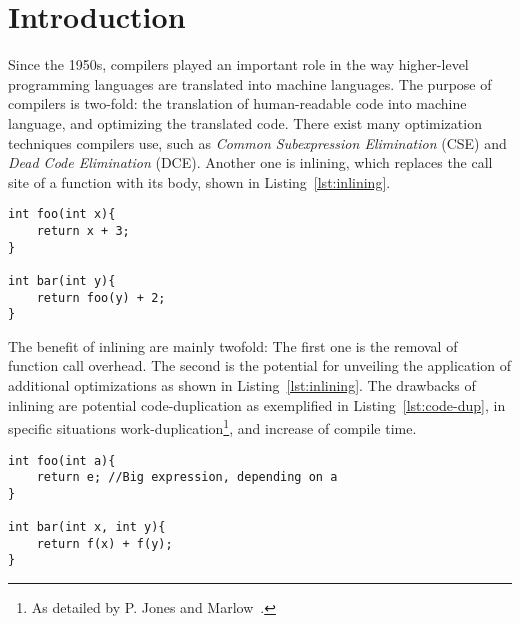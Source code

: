 
\section{Introduction}
\label{introduction}

Since the 1950s, compilers played an important role in the way higher-level
programming languages are translated into machine languages. The purpose of
compilers is two-fold: the translation of human-readable code into machine
language, and optimizing the translated code. There exist many optimization
techniques compilers use, such as \textit{Common Subexpression Elimination}
(CSE) and \textit{Dead Code Elimination} (DCE). Another one is inlining, which
replaces the call site of a function with its body, shown in
Listing~\ref{lst:inlining}.

\begin{lstlisting}[label={lst:inlining}, style=customcpp,
caption={Function \lstinline!foo()! inlined into function \lstinline!bar()!
results in the body of \lstinline!bar()! being \lstinline!return x + 3 + 2!, in
which case constant folding can be applied, replacing the \textit{return}
expression of \lstinline!bar()! with: \lstinline!x + 5!.}]
int foo(int x){
	return x + 3;
}

int bar(int y){
	return foo(y) + 2;
}
\end{lstlisting}
\vspace{-4\parskip} %

The benefit of inlining are mainly twofold: The first one is the removal of
function call overhead. The second is the potential for unveiling the
application of additional optimizations as shown in Listing~\ref{lst:inlining}.
The drawbacks of inlining are potential code-duplication as exemplified in
Listing~\ref{lst:code-dup}, in specific situations work-duplication\footnote{As
detailed by P. Jones and Marlow~\cite{GHCPaper}.}, and increase of compile time.

\begin{lstlisting}[label={lst:code-dup}, style=customcpp,
caption={Code duplication in \lstinline!bar()!, when inlining \lstinline!foo()!
into \lstinline!bar()!. The big expression \lstinline!e! in \lstinline!foo()!,
would be duplicated when inlined into \lstinline!bar()!, potentially leading to
code-duplication. However, CSE might be able to mitigate code-duplication.}]
int foo(int a){
	return e; //Big expression, depending on a
}

int bar(int x, int y){
	return f(x) + f(y);
}
\end{lstlisting}
\vspace{-4\parskip} %

